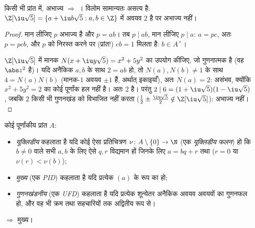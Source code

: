 \begin{proposition}\label{prop:b3:rings:primeirred}
किसी भी प्रांत में, अभाज्य $\Rightarrow$ । विलोम सामान्यतः असत्य
है: $\Z[\iu\sqrt 5] = \{a + \iu b\sqrt5 : a, b
\in \Z\}$ में अवयव $2$  है पर अभाज्य नहीं।
\end{proposition}

\begin{proof}
मान लीजिए $p$ अभाज्य है और $p = ab$। तब $p \mid ab$, मान लीजिए $p \mid a$:
$a = pc$, अतः $p = pcb$, और $p$ को निरस्त करने पर (प्रांत!) $cb =
1$
मिलता है: $b \in A^\times$।

$\Z[\iu\sqrt5]$ में मानक $N(x + \iu y\sqrt 5) = x^2 +
5y^2$ का उपयोग कीजिए, जो गुणनात्मक है (वह $\abs z^2$
है)। यदि अनैकिक $a, b$ के साथ $2 = ab$ हो, तो $N(a), N(b) \neq
1$ के साथ $4 = N(a)N(b)$
(मानक-$1$ अवयव $\pm1$ हैं, अर्थात् इकाइयाँ), अतः $N(a) = 2$:
असंभव, क्योंकि $x^2 + 5y^2 = 2$ का कोई पूर्णांक हल नहीं है। अतः $2$
 है। परंतु $2 \mid 6 = (1 + \iu\sqrt5)(1 - \iu\sqrt5)$, जबकि $2$ किसी भी गुणनखंड को विभाजित
नहीं करता ($\frac12 \pm \frac{\iu\sqrt5}2
\notin \Z[\iu\sqrt5]$): अभाज्य नहीं।
\end{proof}

\begin{definition}\label{def:b3:rings:pidufd}
कोई पूर्णांकीय प्रांत $A$:
\begin{itemize}
  \item \emph{यूक्लिडीय} कहलाता है यदि
        कोई ऐसा प्रतिचित्रण $\nu \colon A \setminus \{0\} \to \N$ (एक \emph{यूक्लिडीय फलन}) हो
        कि $b \ne 0$ वाले सभी $a, b$ के लिए ऐसे $q, r$ विद्यमान हों
        जिनके लिए $a = bq + r$ तथा ($r = 0$ या $\nu(r) <
        \nu(b)$);
  \item \emph{मुख्य} (एक \emph{PID})
        कहलाता है यदि प्रत्येक  $(a)$ के रूप का हो;
  \item \emph{गुणनखंडनीय} (एक \emph{UFD}) कहलाता है यदि प्रत्येक शून्येतर अनैकिक
        अवयव  अवयवों का गुणनफल हो, और वह भी क्रम तथा
        सहचारियों तक अद्वितीय रूप से।
\end{itemize}
\end{definition}

\begin{theorem}\label{thm:b3:rings:euclideanpid}
 $\Rightarrow$ मुख्य।
\end{theorem}

